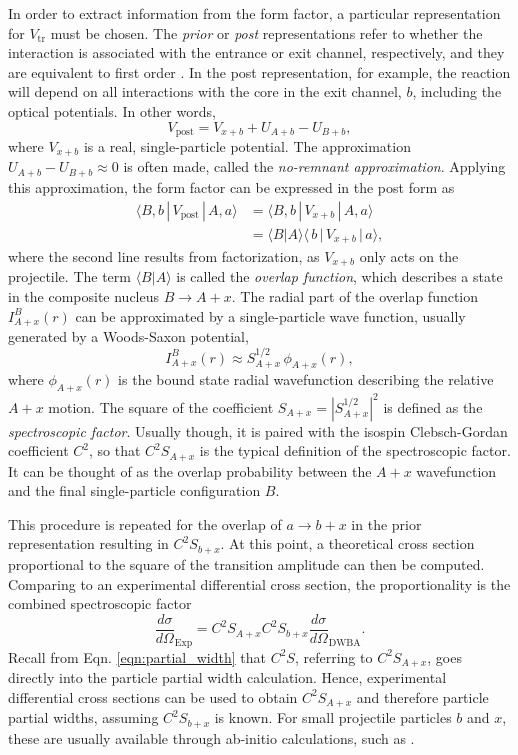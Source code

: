 In order to extract information from the form factor, a particular representation for $V_{\mathrm{tr}}$ must be chosen. The \emph{prior} or \emph{post} representations refer to whether the interaction is associated with the entrance or exit channel, respectively, and they are equivalent to first order \cite{Satchler1983}. In the post representation, for example, the reaction will depend on all interactions with the core in the exit channel, $b$, including the optical potentials. In other words,
\begin{equation}
V_{\mathrm{post}} = V_{x+b} + U_{A+b} - U_{B+b},
\end{equation}
where $V_{x+b}$ is a real, single-particle potential. The approximation $U_{A+b} - U_{B+b} \approx 0$ is often made, called the \emph{no-remnant approximation}. Applying this approximation, the form factor can be expressed in the post form as
\begin{align}
\langle B,b \, | \, V_{\mathrm{post}} \, | \, A,a \rangle &= \langle B,b \, | \, V_{x+b} \, | \, A,a \rangle \nonumber \\
&= \langle B|A \rangle \langle \, b \, | \, V_{x+b}\, | \, a \rangle,
\end{align}
where the second line results from factorization, as $V_{x+b}$ only acts on the projectile. The term $\langle B|A \rangle$ is called the \emph{overlap function}, which describes a state in the composite nucleus $B \rightarrow A + x$. The radial part of the overlap function $I^{B}_{A+x}(r)$ can be approximated by a single-particle wave function, usually generated by a Woods-Saxon potential,
\begin{equation}
I^{B}_{A+x}(r) \approx S^{1/2}_{A+x} \, \phi_{A+x}(r),
\end{equation}
where $\phi_{A+x}(r)$ is the bound state radial wavefunction describing the relative $A+x$ motion. The square of the coefficient $S_{A+x} = |S^{1/2}_{A+x}|^{2}$ is defined as the \emph{spectroscopic factor}. Usually though, it is paired with the isospin Clebsch-Gordan coefficient $C^{2}$, so that $C^{2}S_{A+x}$ is the typical definition of the spectroscopic factor. It can be thought of as the overlap probability between the $A+x$ wavefunction and the final single-particle configuration $B$. 

This procedure is repeated for the overlap of $a \rightarrow b + x$ in the prior representation resulting in $C^{2}S_{b+x}$. At this point, a theoretical cross section proportional to the square of the transition amplitude can then be computed. Comparing to an experimental differential cross section, the proportionality is the combined spectroscopic factor
\begin{equation}
\frac{d \sigma}{d \Omega}_{\mathrm{Exp}} = C^{2}S_{A+x}C^{2}S_{b+x} \frac{d \sigma}{d \Omega}_{\mathrm{DWBA}}.
\end{equation}
Recall from Eqn. \ref{eqn:partial_width} that $C^{2}S$, referring to $C^{2}S_{A+x}$, goes directly into the particle partial width calculation. Hence, experimental differential cross sections can be used to obtain $C^{2}S_{A+x}$ and therefore particle partial widths, assuming $C^{2}S_{b+x}$ is known. For small projectile particles $b$ and $x$, these are usually available through ab-initio calculations, such as \cite{Brida2011}.